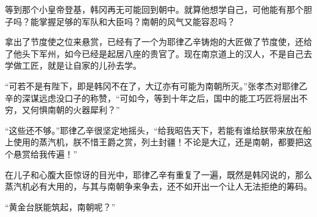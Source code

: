 等到那个小皇帝登基，韩冈再无可能回到朝中。就算他想学自己，可他能有那个胆子吗？能掌握足够的军队和大臣吗？南朝的风气又能容忍吗？

拿出了节度使之位来悬赏，已经有了一个为耶律乙辛铸炮的大匠做了节度使，还给了他头下军州，如今已经是起居八座的贵官了。现在南京道上的汉人，不是自己去学做工匠，就是让自家的儿孙去学。

“可若不是有陛下，即是韩冈不在了，大辽亦有可能为南朝所灭。”张孝杰对耶律乙辛的深谋远虑没口子的称赞，“可如今，等到十年之后，国中的能工巧匠将层出不穷，又何惧南朝的火器犀利？”

“这些还不够。”耶律乙辛很坚定地摇头，“给我昭告天下，若能有谁给朕带来放在船上使用的蒸汽机，朕不惜王爵之赏，列土封疆！不论是大辽，还是南朝，都要把这个悬赏给我传遍！”

在儿子和心腹大臣惊讶的目光中，耶律乙辛有重复了一遍，既然是韩冈说的，那么蒸汽机必有大用的，与其与南朝争来争去，还不如开出一个让人无法拒绝的筹码。

“黄金台朕能筑起，南朝呢？”
